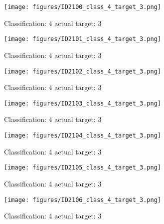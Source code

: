 \begin{figure}[h!]
\begin{center}
\texttt{[image: figures/ID2100\_class\_4\_target\_3.png]}
\end{center}
\caption{ Classification: 4 actual target: 3}
\label{fig:ID2100_class_4_target_3}
\end{figure}
\begin{figure}[h!]
\begin{center}
\texttt{[image: figures/ID2101\_class\_4\_target\_3.png]}
\end{center}
\caption{ Classification: 4 actual target: 3}
\label{fig:ID2101_class_4_target_3}
\end{figure}
\begin{figure}[h!]
\begin{center}
\texttt{[image: figures/ID2102\_class\_4\_target\_3.png]}
\end{center}
\caption{ Classification: 4 actual target: 3}
\label{fig:ID2102_class_4_target_3}
\end{figure}
\begin{figure}[h!]
\begin{center}
\texttt{[image: figures/ID2103\_class\_4\_target\_3.png]}
\end{center}
\caption{ Classification: 4 actual target: 3}
\label{fig:ID2103_class_4_target_3}
\end{figure}
\begin{figure}[h!]
\begin{center}
\texttt{[image: figures/ID2104\_class\_4\_target\_3.png]}
\end{center}
\caption{ Classification: 4 actual target: 3}
\label{fig:ID2104_class_4_target_3}
\end{figure}
\begin{figure}[h!]
\begin{center}
\texttt{[image: figures/ID2105\_class\_4\_target\_3.png]}
\end{center}
\caption{ Classification: 4 actual target: 3}
\label{fig:ID2105_class_4_target_3}
\end{figure}
\begin{figure}[h!]
\begin{center}
\texttt{[image: figures/ID2106\_class\_4\_target\_3.png]}
\end{center}
\caption{ Classification: 4 actual target: 3}
\label{fig:ID2106_class_4_target_3}
\end{figure}
